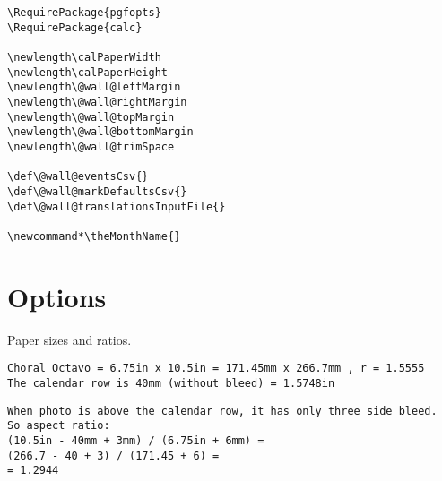 \documentclass[11pt,oneside]{memoir-article}
\begin{document}
\begin{verbatim}
\RequirePackage{pgfopts}
\RequirePackage{calc}

\newlength\calPaperWidth
\newlength\calPaperHeight
\newlength\@wall@leftMargin
\newlength\@wall@rightMargin
\newlength\@wall@topMargin
\newlength\@wall@bottomMargin
\newlength\@wall@trimSpace

\def\@wall@eventsCsv{}
\def\@wall@markDefaultsCsv{}
\def\@wall@translationsInputFile{}

\newcommand*\theMonthName{}
\end{verbatim}

\chapter{Options}
\label{sec:org3c6825c}

Paper sizes and ratios.

\begin{verbatim}
Choral Octavo = 6.75in x 10.5in = 171.45mm x 266.7mm , r = 1.5555
The calendar row is 40mm (without bleed) = 1.5748in
\end{verbatim}

\begin{verbatim}
When photo is above the calendar row, it has only three side bleed.
So aspect ratio:
(10.5in - 40mm + 3mm) / (6.75in + 6mm) = 
(266.7 - 40 + 3) / (171.45 + 6) =
= 1.2944
\end{verbatim}
\end{document}
